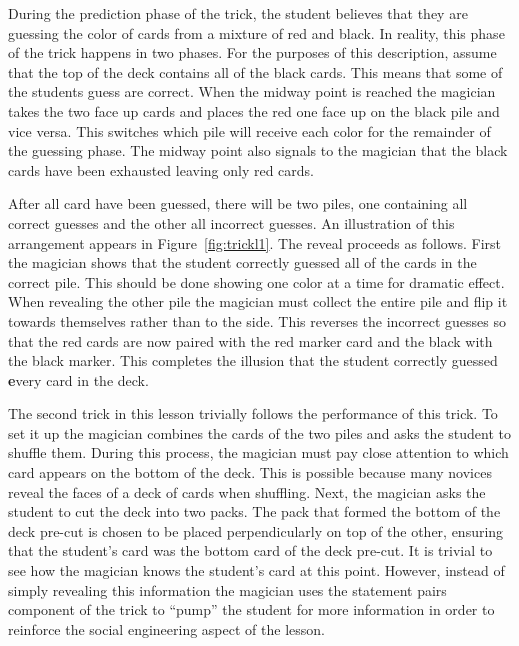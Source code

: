 During the prediction phase of the trick, the student believes that they are
guessing the color of cards from a mixture of red and black.  In reality, this
phase of the trick happens in two phases.
For the purposes of this description,
assume that the top of the deck
contains all of the black cards.
This means that some of the students
guess are correct.
When the midway point is reached the magician takes the two face up cards and places the
red one face up on the black pile and vice versa.  This switches which pile will
receive each color for the remainder of the guessing phase.  The midway point
also signals to the magician that the black cards have been
exhausted leaving only red cards.

After all card have been guessed, there will be two piles,
one containing all correct guesses and the other
all incorrect guesses.
An illustration of this arrangement appears in Figure~\ref{fig:trickl1}.
The reveal proceeds as follows.
First the magician shows that the student correctly guessed all of the cards
in the correct pile.  This should be done showing one color at a time for
dramatic effect.  When revealing the other pile the magician must collect the
entire pile and flip it towards themselves rather than to the side.  This
reverses the incorrect guesses so that the red cards are now paired
with the red marker card and the black with the black marker.  This completes
the illusion that the student correctly guessed {\textbf every} card in the
deck.

The second trick in this lesson trivially follows the performance of this trick.
To set it up the magician combines the cards of the two piles and asks the
student to shuffle them.  During this process, the magician must pay close
attention to which card appears on the bottom of the deck.  This is possible
because many novices reveal the faces of a deck of cards when shuffling.  Next,
the magician asks the student to cut the deck into two packs.  The pack that
formed the bottom of the deck pre-cut is chosen to be placed perpendicularly on
top of the other, ensuring that the student's card was the bottom card of
the deck pre-cut.  It is trivial to see how the magician knows the student's
card at this point.  However, instead of simply revealing this information the
magician uses the statement pairs component of the trick to ``pump'' the student
for more information in order to reinforce the social engineering aspect of the
lesson.

%

